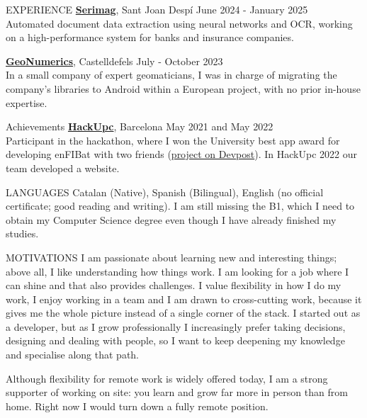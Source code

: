 \documentclass{resume} %
\begin{document}
\begin{rSection}{EXPERIENCE}
  \textbf{\href{https://serimag.com/en/}{Serimag}}, Sant Joan Despí
  \hfill {June 2024 - January 2025} \\
  Automated document data extraction using neural networks and OCR,
  working on a high-performance system for banks and insurance companies.

  \textbf{\href{https://www.geonumerics.es/}{GeoNumerics}}, Castelldefels
  \hfill {July - October 2023} \\
  In a small company of expert geomaticians, I was in charge of migrating
  the company's libraries to Android within a European project, with no
  prior in-house expertise.

\end{rSection}

\begin{rSection}{Achievements}
  \textbf{\href{https://hackupc.com/}{HackUpc}}, Barcelona \hfill
  May 2021 and May 2022 \\
  Participant in the hackathon, where I won the University best app award
  for developing enFIBat with two friends
  (\href{https://devpost.com/pololo300}{project on Devpost}). In HackUpc
  2022 our team developed a website.
\end{rSection}

\begin{rSection}{LANGUAGES}
  Catalan (Native), Spanish (Bilingual), English (no official
  certificate; good reading and writing). I am still missing the B1,
  which I need to obtain my Computer Science degree even though I have
  already finished my studies.
\end{rSection}

\begin{rSection}{MOTIVATIONS}
  I am passionate about learning new and interesting things; above all, I
  like understanding how things work. I am looking for a job where I can
  shine and that also provides challenges. I value flexibility in how I do
  my work, I enjoy working in a team and I am drawn to cross-cutting work,
  because it gives me the whole picture instead of a single corner of the
  stack. I started out as a developer, but as I grow professionally I
  increasingly prefer taking decisions, designing and dealing with people,
  so I want to keep deepening my knowledge and specialise along that path.

  Although flexibility for remote work is widely offered today, I am a
  strong supporter of working on site: you learn and grow far more in
  person than from home. Right now I would turn down a fully remote
  position.
\end{rSection}
\end{document}
